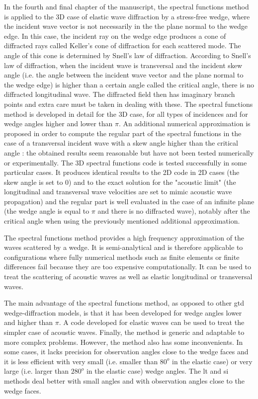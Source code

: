In the fourth and final chapter of the manuscript, the spectral functions method is applied to the 3D case of elastic wave diffraction by a stress-free wedge, where the incident wave vector is not necessarily in the the plane normal to the wedge edge. In this case, the incident ray on the wedge edge produces a cone of diffracted rays called Keller's cone of diffraction for each scattered mode. The angle of this cone is determined by Snell's law of diffraction. According to Snell's law of diffraction, when the incident wave is transversal and the incident skew angle (i.e. the angle between the incident wave vector and the plane normal to the wedge edge) is higher than a certain angle called the critical angle, there is no diffracted longitudinal wave. The diffracted field then has imaginary branch points and extra care must be taken in dealing with these. The spectral functions method is developed in detail for the 3D case, for all types of incidences and for wedge angles higher and lower than $\pi$. An additional numerical approximation is proposed in order to compute the regular part of the spectral functions in the case of a transversal incident wave with a skew angle higher than the critical angle : the obtained results seem reasonable but have not been tested numerically or experimentally. The 3D spectral functions code is tested successfully in some particular cases. It produces identical results to the 2D code in 2D cases (the skew angle is set to $0$) and to the exact solution for the "acoustic limit" (the longitudinal and transversal wave velocities are set to mimic acoustic wave propagation) and the regular part is well evaluated in the case of an infinite plane (the wedge angle is equal to $\pi$ and there is no diffracted wave), notably after the critical angle when using the previously mentioned additional approximation.

The spectral functions method provides a high frequency approximation of the waves scattered by a wedge. It is semi-analytical and is therefore applicable to configurations where fully numerical methods such as finite elements or finite differences fail because they are too expensive computationally. It can be used to treat the scattering of acoustic waves as well as elastic longitudinal or transversal waves.

The main advantage of the spectral functions method, as opposed to other \acrshort{gtd} wedge-diffraction models, is that it has been developed for wedge angles lower and higher than $\pi$. A code developed for elastic waves can be used to treat the simpler case of acoustic waves. Finally, the method is generic and adaptable to more complex problems. However, the method also has some inconvenients. In some cases, it lacks precision for observation angles close to the wedge faces and it is less efficient with very small (i.e. smaller than $80^o$ in the elastic case) or very large (i.e. larger than $280^o$ in the elastic case) wedge angles. The \acrlong{lt} and \acrlong{si} methods deal better with small angles and with observation angles close to the wedge faces.

